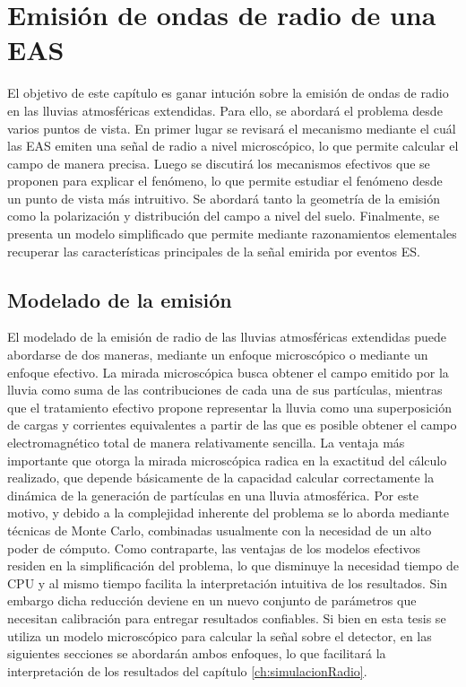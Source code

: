 \chapter{Emisi\'on de ondas de radio de una EAS}
\label{ch:easRadio}

El objetivo de este cap\'itulo es ganar intuci\'on sobre la emisión de ondas de radio en las lluvias atmosféricas extendidas.
Para ello, se abordar\'a el problema desde varios puntos de vista.
En primer lugar se revisar\'a el mecanismo mediante el cu\'al las EAS emiten una se\~nal de radio a nivel microsc\'opico, lo que permite calcular el campo de manera precisa. 
Luego se discutir\'a los mecanismos efectivos que se proponen para explicar el fen\'omeno, lo que permite estudiar el fen\'omeno desde un punto de vista m\'as intruitivo.
Se abordar\'a tanto la geometr\'ia de la emisi\'on como la polarizaci\'on y distribuci\'on del campo a nivel del suelo.
Finalmente, se presenta un modelo simplificado que permite mediante razonamientos elementales recuperar las caracter\'isticas principales de la se\~nal emirida por eventos ES.

\section{Modelado de la emisi\'on}
\label{sc:gen_emision}

El modelado de la emisi\'on de radio de las lluvias atmosf\'ericas extendidas puede abordarse de dos maneras, mediante un enfoque microsc\'opico o mediante un enfoque efectivo.
La mirada microsc\'opica busca obtener el campo emitido por la lluvia como suma de las contribuciones de cada una de sus part\'iculas, mientras que el tratamiento efectivo propone representar la lluvia como una superposici\'on de cargas y corrientes equivalentes a partir de las que es posible obtener el campo electromagn\'etico total de manera relativamente sencilla.
La ventaja m\'as importante que otorga la mirada microsc\'opica radica en la exactitud del c\'alculo realizado, que depende b\'asicamente de la capacidad calcular correctamente la din\'amica de la generaci\'on de part\'iculas en una lluvia atmosf\'erica.
Por este motivo, y debido a la complejidad inherente del problema se lo aborda mediante t\'ecnicas de Monte Carlo, combinadas usualmente con la necesidad de un alto poder de c\'omputo.
Como contraparte, las ventajas de los modelos efectivos residen en la simplificaci\'on del problema, lo que disminuye la necesidad tiempo de CPU y al mismo tiempo facilita la interpretaci\'on intuitiva de los resultados. 
Sin embargo dicha reducci\'on deviene en un nuevo conjunto de par\'ametros que necesitan calibraci\'on para entregar resultados confiables.
Si bien en esta tesis se utiliza un modelo microsc\'opico para calcular la se\~nal sobre el detector, en las siguientes secciones se abordar\'an ambos enfoques, lo que facilitar\'a la interpretaci\'on de los resultados del cap\'itulo \ref{ch:simulacionRadio}.


